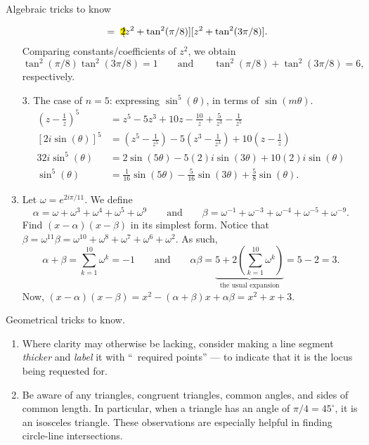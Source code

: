\documentclass[oneside]{book}
\newcommand{\highlight}[2][red!50]{\mathpalette{\highlightwithstyle[#1]}{#2}}
\newcommand{\highlightwithstyle}[3][red!50]{
  \begingroup                         %
    \sbox0{$\mathsurround 0pt #2#3$}%
    \setlength{\fboxsep}{.5pt}        %
    \sbox2{\hspace{-.5pt}%
      \colorbox{#1}{\usebox0}%
    }%
    \dp2=\dp0 \ht2=\ht0 \wd2=\wd0     %
    \box2                             %
  \endgroup                           %
}
\begin{document}
\begin{example}{Algebraic tricks to know}{}
\begin{enumerate}
\begin{align*}
      &= \highlight[yellow]{2}[z^2+\tan^2(\pi/8)][z^2+\tan^2(3\pi/8)].
    \end{align*}
    Comparing constants/coefficients of \(z^2\), we obtain 
    \[\tan^2(\pi/8)\tan^2(3\pi/8)=1 \qquad\text{and}\qquad \tan^2(\pi/8)+\tan^2(3\pi/8)=6,\]
    respectively.  
    \item[3.] The case of \(n=5\): expressing \(\sin^5(\theta)\), in terms of \(\sin(m\theta)\).
    \begin{align*}
      \left( z-\frac{1}{z} \right)^5 &= z^5-5z^3+10z-\frac{10}{z}+\frac{5}{z^3}-\frac{1}{z^5}\\
      [2i\sin(\theta)]^5 &= \left( z^5-\frac{1}{z^5} \right)-5\left( z^3-\frac{1}{z^3} \right)+10\left( z-\frac{1}{z} \right)\\
      32i\sin^5(\theta) &= 2\sin(5\theta)-5(2)i\sin(3\theta)+10(2)i\sin(\theta)\\
      \sin^5(\theta) &= \frac{1}{16}\sin(5\theta)-\frac{5}{16}\sin(3\theta)+\frac{5}{8}\sin(\theta).
    \end{align*}
    \setcounter{enumi}{6}
    \item Let \(\omega=e^{2i\pi/11}\). We define
    \[\alpha=\omega+\omega^3+\omega^4+\omega^5+\omega^9 \qquad\text{and}\qquad \beta=\omega^{-1}+\omega^{-3}+\omega^{-4}+\omega^{-5}+\omega^{-9}.\]
    Find \((x-\alpha)(x-\beta)\) in its simplest form. Notice that \(\beta=\omega^{11}\beta=\omega^{10}+\omega^8+\omega^7+\omega^6+\omega^2\). As such,
    \[\alpha+\beta=\sum_{k=1}^{10}{\omega^k}=-1 \qquad\text{and}\qquad \alpha\beta=\underbrace{5+2\left( \sum_{k=1}^{10}{\omega^k} \right)}_{\text{the usual expansion}}=5-2=3.\]
    Now, \((x-\alpha)(x-\beta)=x^2-(\alpha+\beta)x+\alpha\beta=x^2+x+3\).
  \end{enumerate}
\end{example}
\begin{note}
  Geometrical tricks to know.
  \begin{enumerate}
    \item Where clarity may otherwise be lacking, consider making a line segment \emph{thicker} and \emph{label} it with ``\textrightarrow\ required points'' --- to indicate that it is the locus being requested for.  
    \item Be aware of any triangles, congruent triangles, common angles, and sides of common length. In particular, when a triangle has an angle of \(\pi/4=45^{\circ}\), it is an isosceles triangle. These observations are especially helpful in finding circle-line intersections.
  \end{enumerate}
\end{note}
\end{document}
